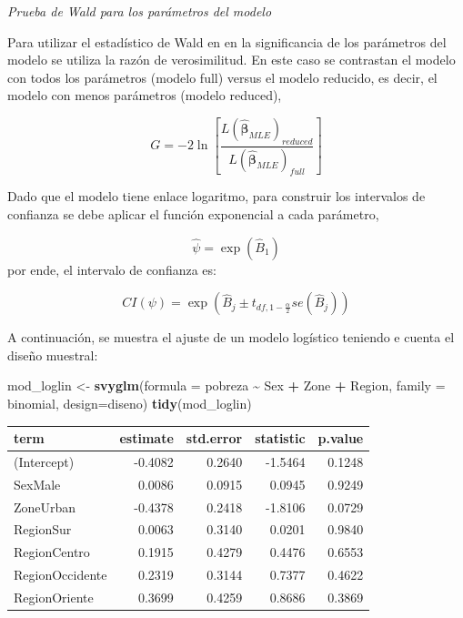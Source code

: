 \documentclass[
  spanish,
  12pt,
]{book}
\newenvironment{Shaded}{\begin{snugshade}}{\end{snugshade}}
\newcommand{\AttributeTok}[1]{\textcolor[rgb]{0.13,0.29,0.53}{#1}}
\newcommand{\FunctionTok}[1]{\textcolor[rgb]{0.13,0.29,0.53}{\textbf{#1}}}
\newcommand{\NormalTok}[1]{#1}
\newcommand{\OtherTok}[1]{\textcolor[rgb]{0.56,0.35,0.01}{#1}}
\newcommand{\SpecialCharTok}[1]{\textcolor[rgb]{0.81,0.36,0.00}{\textbf{#1}}}
\begin{document}
\emph{Prueba de Wald para los parámetros del modelo}

Para utilizar el estadístico de Wald en en la significancia de los parámetros del modelo se utiliza la razón de verosimilitud. En este caso se contrastan el modelo con todos los parámetros (modelo full) versus el modelo reducido, es decir, el modelo con menos parámetros (modelo reduced),

\[
    G=-2\ln\left[\frac{L\left(\hat{\boldsymbol{\beta}}_{MLE}\right)_{reduced}}{L\left(\hat{\boldsymbol{\beta}}_{MLE}\right)_{full}}\right]
\]

Dado que el modelo tiene enlace logaritmo, para construir los intervalos de confianza se debe aplicar el función exponencial a cada parámetro,

\[
    \hat{\psi}=\exp\left(\hat{B}_{1}\right)
\]
por ende, el intervalo de confianza es:

\[
    CI\left(\psi\right)=\exp\left(\hat{B}_{j}\pm t_{df,1-\frac{\alpha}{2}}se\left(\hat{B}_{j}\right)\right)
\]

A continuación, se muestra el ajuste de un modelo logístico teniendo e cuenta el diseño muestral:

\begin{Shaded}
\begin{Highlighting}[]
\NormalTok{  mod\_loglin }\OtherTok{\textless{}{-}} \FunctionTok{svyglm}\NormalTok{(}\AttributeTok{formula =}\NormalTok{ pobreza }\SpecialCharTok{\textasciitilde{}}\NormalTok{ Sex }\SpecialCharTok{+}\NormalTok{ Zone }\SpecialCharTok{+}\NormalTok{ Region,}
                       \AttributeTok{family =}\NormalTok{ binomial, }
                       \AttributeTok{design=}\NormalTok{diseno)}
  \FunctionTok{tidy}\NormalTok{(mod\_loglin) }
\end{Highlighting}
\end{Shaded}

\begin{tabular}{l|r|r|r|r}
\hline
term & estimate & std.error & statistic & p.value\\
\hline
(Intercept) & -0.4082 & 0.2640 & -1.5464 & 0.1248\\
\hline
SexMale & 0.0086 & 0.0915 & 0.0945 & 0.9249\\
\hline
ZoneUrban & -0.4378 & 0.2418 & -1.8106 & 0.0729\\
\hline
RegionSur & 0.0063 & 0.3140 & 0.0201 & 0.9840\\
\hline
RegionCentro & 0.1915 & 0.4279 & 0.4476 & 0.6553\\
\hline
RegionOccidente & 0.2319 & 0.3144 & 0.7377 & 0.4622\\
\hline
RegionOriente & 0.3699 & 0.4259 & 0.8686 & 0.3869\\
\hline
\end{tabular}
\end{document}
